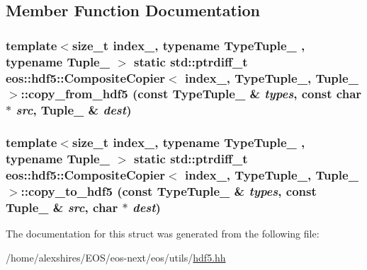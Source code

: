 \subsection{Member Function Documentation}
\hypertarget{structeos_1_1hdf5_1_1CompositeCopier_ac9d6c53322b8f138c48ed5bfc951f796}{
\subsubsection[{copy\_\-from\_\-hdf5}]{\setlength{\rightskip}{0pt plus 5cm}template$<$size\_\-t index\_\-, typename TypeTuple\_\- , typename Tuple\_\- $>$ static std::ptrdiff\_\-t {\bf eos::hdf5::CompositeCopier}$<$ index\_\-, TypeTuple\_\-, Tuple\_\- $>$::copy\_\-from\_\-hdf5 (const TypeTuple\_\- \& {\em types}, \/  const char $\ast$ {\em src}, \/  Tuple\_\- \& {\em dest})}}
\label{structeos_1_1hdf5_1_1CompositeCopier_ac9d6c53322b8f138c48ed5bfc951f796}
\hypertarget{structeos_1_1hdf5_1_1CompositeCopier_a22ef8fb00bdff57f9fb8c8556d45d497}{
\subsubsection[{copy\_\-to\_\-hdf5}]{\setlength{\rightskip}{0pt plus 5cm}template$<$size\_\-t index\_\-, typename TypeTuple\_\- , typename Tuple\_\- $>$ static std::ptrdiff\_\-t {\bf eos::hdf5::CompositeCopier}$<$ index\_\-, TypeTuple\_\-, Tuple\_\- $>$::copy\_\-to\_\-hdf5 (const TypeTuple\_\- \& {\em types}, \/  const Tuple\_\- \& {\em src}, \/  char $\ast$ {\em dest})}}
\label{structeos_1_1hdf5_1_1CompositeCopier_a22ef8fb00bdff57f9fb8c8556d45d497}


The documentation for this struct was generated from the following file:\begin{DoxyCompactItemize}
\item 
/home/alexshires/EOS/eos-\/next/eos/utils/\hyperlink{hdf5_8hh}{hdf5.hh}\end{DoxyCompactItemize}
